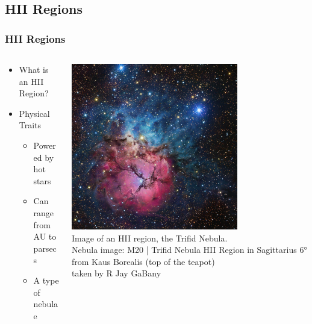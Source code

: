\documentclass[aspectratio=169,compress]{beamer}
\newcommand\teeny{\fontsize{3pt}{3.6pt}\selectfont}
\begin{document}
\subsection{HII Regions}
\begin{frame}
  \frametitle{HII Regions}
  \begin{columns}
    \begin{column}{0.5\textwidth}%
      \begin{itemize}
        \item What is an HII Region?
        \item Physical Traits
          \begin{itemize}
            \item Powered by hot stars
            \item Can range from AU to parsecs
            \item A type of nebulae
          \end{itemize}
      \end{itemize}
    \end{column}
    \begin{column}{0.5\textwidth}%
      \teeny
      \includegraphics[width=0.7\textwidth]{figures/nebula.jpg}
      {\teeny\\ Image of an HII region, the Trifid Nebula.}
      {\teeny\\ Nebula image: M20 | Trifid Nebula HII Region in Sagittarius 6° from Kaus Borealis (top of the teapot)} 
      {\teeny\\ taken by R Jay GaBany}
      
    \end{column}
  \end{columns}
\end{frame}
\end{document}
